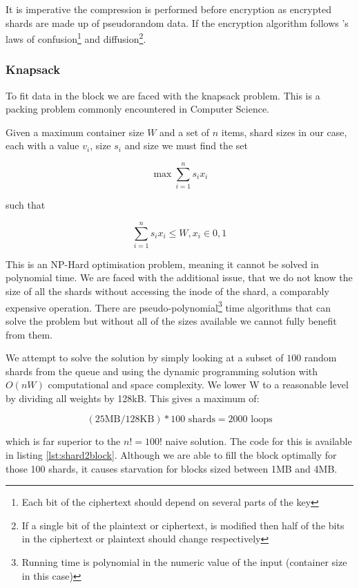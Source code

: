 \documentclass[11pt, a4paper, twoside]{report}
\begin{document}
It is imperative the compression is performed before encryption as encrypted shards are made up of pseudorandom data. If the encryption algorithm follows \cite{shannon1945mathematical}'s laws of confusion\footnote{Each bit of the ciphertext should depend on several parts of the key} and diffusion\footnote{If a single bit of the plaintext or ciphertext, is modified then half of the bits in the ciphertext or plaintext should change respectively}.

\subsubsection{Knapsack}

To fit data in the block we are faced with the knapsack problem. This is a packing problem commonly encountered in Computer Science. \citep{skiena1999interested}

Given a maximum container size $W$ and a set of $n$ items, shard sizes in our case, each with a value $v_i$, size $s_i$ and size we must find the set 

$$\max \sum_{i=1}^{n} s_{i}x_{i}$$ 

such that 

$$\sum_{i=1}^{n} s_{i}x_{i} \leq W, x_i \in {0, 1}$$

This is an NP-Hard optimisation problem, \citep{skiena1999interested} meaning it cannot be solved in polynomial time. We are faced with the additional issue, that we do not know the size of all the shards without accessing the inode of the shard, a comparably expensive operation. There are pseudo-polynomial\footnote{Running time is polynomial in the numeric value of the input (container size in this case)} time algorithms that can solve the problem but without all of the sizes available we cannot fully benefit from them.

We attempt to solve the solution by simply looking at a subset of $100$ random shards from the queue and using the dynamic programming solution with $O(nW)$ computational and space complexity. \citep{martello1999dynamic} We lower W to a reasonable level by dividing all weights by 128kB. This gives a maximum of: 

$$(25\mbox{MB} / 128\mbox{KB}) * 100  \mbox{ shards} = 2000 \mbox{ loops}$$ 

which is far superior to the $n! = 100!$ naive solution. The code for this is available in listing \ref{lst:shard2block}. Although we are able to fill the block optimally for those 100 shards, it causes starvation for blocks sized between 1MB and 4MB.
\end{document}
